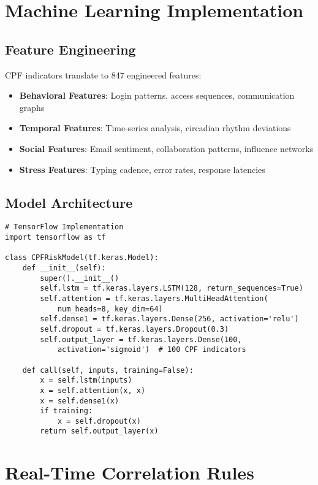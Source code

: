 \documentclass[11pt,a4paper]{article}
\begin{document}
\section{Machine Learning Implementation}

\subsection{Feature Engineering}

CPF indicators translate to 847 engineered features:

\begin{itemize}
\item \textbf{Behavioral Features}: Login patterns, access sequences, communication graphs
\item \textbf{Temporal Features}: Time-series analysis, circadian rhythm deviations
\item \textbf{Social Features}: Email sentiment, collaboration patterns, influence networks
\item \textbf{Stress Features}: Typing cadence, error rates, response latencies
\end{itemize}

\subsection{Model Architecture}

\noindent\begin{minipage}{\linewidth}
\begin{lstlisting}
# TensorFlow Implementation
import tensorflow as tf

class CPFRiskModel(tf.keras.Model):
    def __init__(self):
        super().__init__()
        self.lstm = tf.keras.layers.LSTM(128, return_sequences=True)
        self.attention = tf.keras.layers.MultiHeadAttention(
            num_heads=8, key_dim=64)
        self.dense1 = tf.keras.layers.Dense(256, activation='relu')
        self.dropout = tf.keras.layers.Dropout(0.3)
        self.output_layer = tf.keras.layers.Dense(100, 
            activation='sigmoid')  # 100 CPF indicators
    
    def call(self, inputs, training=False):
        x = self.lstm(inputs)
        x = self.attention(x, x)
        x = self.dense1(x)
        if training:
            x = self.dropout(x)
        return self.output_layer(x)
\end{lstlisting}
\end{minipage}

\section{Real-Time Correlation Rules}
\end{document}
